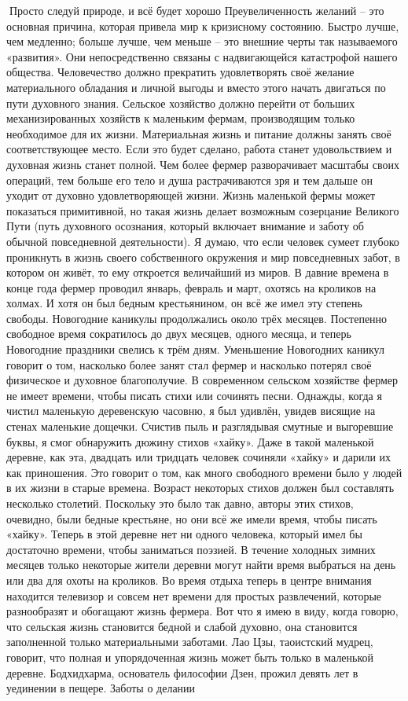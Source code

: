 \documentclass[a4paper]{book}
\begin{document}
Просто следуй природе, и всё будет хорошо
Преувеличенность желаний – это основная причина, которая привела мир к кризисному
состоянию. Быстро лучше, чем медленно; больше лучше, чем меньше – это внешние черты
так называемого «развития». Они непосредственно связаны с надвигающейся катастрофой
нашего общества. Человечество должно прекратить удовлетворять своё желание
материального обладания и личной выгоды и вместо этого начать двигаться по пути
духовного знания.
Сельское хозяйство должно перейти от больших механизированных хозяйств к
маленьким фермам, производящим только необходимое для их жизни. Материальная жизнь и
питание должны занять своё соответствующее место. Если это будет сделано, работа станет
удовольствием и духовная жизнь станет полной.
Чем более фермер разворачивает масштабы своих операций, тем больше его тело и душа
растрачиваются зря и тем дальше он уходит от духовно удовлетворяющей жизни. Жизнь
маленькой фермы может показаться примитивной, но такая жизнь делает возможным
созерцание Великого Пути (путь духовного осознания, который включает внимание и заботу
об обычной повседневной деятельности). Я думаю, что если человек сумеет глубоко
проникнуть в жизнь своего собственного окружения и мир повседневных забот, в котором он
живёт, то ему откроется величайший из миров.
В давние времена в конце года фермер проводил январь, февраль и март, охотясь на
кроликов на холмах. И хотя он был бедным крестьянином, он всё же имел эту степень
свободы. Новогодние каникулы продолжались около трёх месяцев. Постепенно свободное
время сократилось до двух месяцев, одного месяца, и теперь Новогодние праздники свелись
к трём дням.
Уменьшение Новогодних каникул говорит о том, насколько более занят стал фермер и
насколько потерял своё физическое и духовное благополучие. В современном сельском
хозяйстве фермер не имеет времени, чтобы писать стихи или сочинять песни.
Однажды, когда я чистил маленькую деревенскую часовню, я был удивлён, увидев
висящие на стенах маленькие дощечки. Счистив пыль и разглядывая смутные и выгоревшие
буквы, я смог обнаружить дюжину стихов «хайку». Даже в такой маленькой деревне, как эта,
двадцать или тридцать человек сочиняли «хайку» и дарили их как приношения. Это говорит
о том, как много свободного времени было у людей в их жизни в старые времена. Возраст
некоторых стихов должен был составлять несколько столетий. Поскольку это было так
давно, авторы этих стихов, очевидно, были бедные крестьяне, но они всё же имели время,
чтобы писать «хайку».
Теперь в этой деревне нет ни одного человека, который имел бы достаточно времени,
чтобы заниматься поэзией. В течение холодных зимних месяцев только некоторые жители
деревни могут найти время выбраться на день или два для охоты на кроликов. Во время
отдыха теперь в центре внимания находится телевизор и совсем нет времени для простых
развлечений, которые разнообразят и обогащают жизнь фермера. Вот что я имею в виду,
когда говорю, что сельская жизнь становится бедной и слабой духовно, она становится
заполненной только материальными заботами. Лао Цзы, таоистский мудрец, говорит, что
полная и упорядоченная жизнь может быть только в маленькой деревне. Бодхидхарма,
основатель философии Дзен, прожил девять лет в уединении в пещере. Заботы о делании
\end{document}
